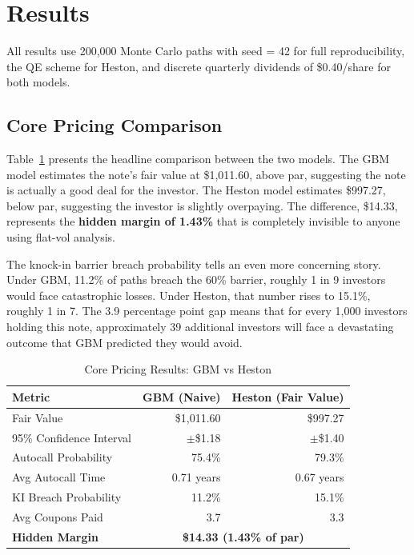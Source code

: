 \documentclass[12pt,a4paper]{article}
\begin{document}
\newpage
\section{Results}
\label{sec:results}

All results use 200,000 Monte Carlo paths with seed = 42 for full reproducibility, the QE scheme for Heston, and discrete quarterly dividends of \$0.40/share for both models.

\subsection{Core Pricing Comparison}

Table~\ref{tab:results} presents the headline comparison between the two models. The GBM model estimates the note's fair value at \$1,011.60, above par, suggesting the note is actually a good deal for the investor. The Heston model estimates \$997.27, below par, suggesting the investor is slightly overpaying. The difference, \$14.33, represents the \textbf{hidden margin of 1.43\%} that is completely invisible to anyone using flat-vol analysis.

The knock-in barrier breach probability tells an even more concerning story. Under GBM, 11.2\% of paths breach the 60\% barrier, roughly 1 in 9 investors would face catastrophic losses. Under Heston, that number rises to 15.1\%, roughly 1 in 7. The 3.9 percentage point gap means that for every 1,000 investors holding this note, approximately 39 additional investors will face a devastating outcome that GBM predicted they would avoid.

\begin{table}[H]
\centering
\caption{Core Pricing Results: GBM vs Heston}
\label{tab:results}
\begin{tabular}{@{}lrr@{}}
\toprule
\textbf{Metric} & \textbf{GBM (Naive)} & \textbf{Heston (Fair Value)} \\
\midrule
Fair Value & \$1,011.60 & \$997.27 \\
95\% Confidence Interval & $\pm$\$1.18 & $\pm$\$1.40 \\
Autocall Probability & 75.4\% & 79.3\% \\
Avg Autocall Time & 0.71 years & 0.67 years \\
KI Breach Probability & 11.2\% & 15.1\% \\
Avg Coupons Paid & 3.7 & 3.3 \\
\midrule
\textbf{Hidden Margin} & \multicolumn{2}{c}{\textbf{\$14.33 (1.43\% of par)}} \\
\bottomrule
\end{tabular}
\end{table}
\end{document}
